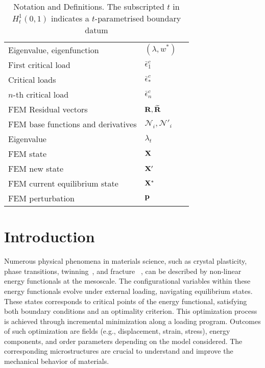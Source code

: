 \begin{table}[h!]
\begin{tabular}{  m{5.5cm}  m{3cm}  m{6cm}  }
    Eigenvalue, eigenfunction& $(\lambda, w^*)$ & \\
    First critical load & $\bar \epsilon^c_1$ & \\
    Critical loads & $\bar \epsilon^c_*$ & \\
    $n$-th critical load & $\bar \epsilon^c_n$ & \\
    FEM Residual vectors& ${\bf R}, \widetilde{\bf R}$ & \\
    FEM base functions and derivatives  & ${\mathcal N}_i, {\mathcal N}'_i$ & \\
   Eigenvalue & $\lambda_t$ & \\
   FEM state & $\mathbf{X}$ & \\
   FEM new state & $\mathbf{X}'$ & \\
   FEM current equilibrium state & $\mathbf{X^*}$ & \\
   FEM perturbation & $\mathbf{p}$ & \\
  \end{tabular}
  \caption{Notation and Definitions. The subscripted $t$ in $H_t^1(0, 1)$ indicates a $t$-parametrised boundary datum}
\label{table:notation}
\end{table}

\section{Introduction}
Numerous physical phenomena in materials science, such as crystal plasticity, phase transitions, twinning~\cite{Clayton2011-xq}, and fracture ~\cite{francfort_marigo1998,Baldelli2014-ho,Baldelli2021-gc}, can be described by non-linear energy functionals at the mesoscale. 
The configurational variables within these energy functionals evolve under external loading, navigating equilibrium states. These states corresponds to critical points of the energy functional, satisfying both boundary conditions and an optimality criterion.
This optimization process is achieved through incremental minimization along a loading program. Outcomes of such optimization are fields
(e.g., displacement, strain, stress), energy components, and order parameters depending on the model considered. The corresponding microstructures are crucial to understand and improve the mechanical behavior of materials.

